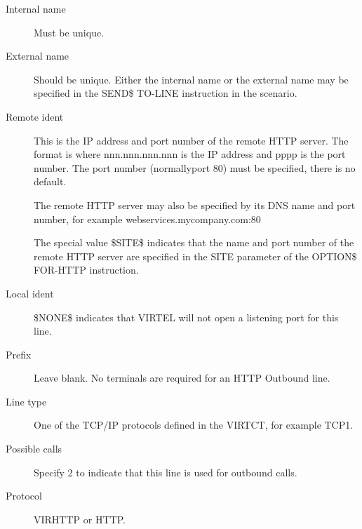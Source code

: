 \documentclass[letterpaper,10pt,english]{sphinxmanual}
\begin{document}
\begin{description}
\item[{Internal name}] \leavevmode
Must be unique.

\item[{External name}] \leavevmode
Should be unique. Either the internal name or the external name may be specified in the SEND\$ TO-LINE instruction in the scenario.

\item[{Remote ident}] \leavevmode
This is the IP address and port number of the remote HTTP server. The format is  where nnn.nnn.nnn.nnn is the
IP address and pppp is the port number. The port number (normallyport 80) must be specified, there is no default.

The remote HTTP server may also be specified by its DNS name and port number, for example webservices.mycompany.com:80

The special value \$SITE\$ indicates that the name and port number of the remote HTTP server are specified in the SITE parameter of the OPTION\$ FOR-HTTP instruction.

\item[{Local ident}] \leavevmode
\$NONE\$ indicates that VIRTEL will not open a listening port for this line.

\item[{Prefix}] \leavevmode
Leave blank. No terminals are required for an HTTP Outbound line.

\item[{Line type}] \leavevmode
One of the TCP/IP protocols defined in the VIRTCT, for example TCP1.

\item[{Possible calls}] \leavevmode
Specify 2 to indicate that this line is used for outbound calls.

\item[{Protocol}] \leavevmode
VIRHTTP or HTTP.

\end{description}
\end{document}

